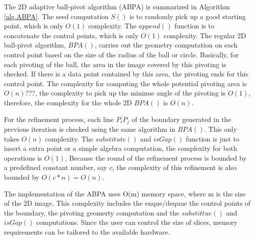 The 2D adaptive ball-pivot algorithm (ABPA) is summarized in Algorithm \ref{alg.ABPA}. 
The seed computation $S()$ is to randomly pick up a good starting point, which
is only $O(1)$ complexity. The $append()$ function is to concatenate the control 
points, which is only $O(1)$ complexity. The regular 2D ball-pivot algorithm, $BPA()$,
carries out the geometry computation on each control point based on the size of the
radius of the ball or circle. Basically, for each pivoting of the ball, the area 
in the image covered by this pivoting is checked. If there is a data point contained
by this area, the pivoting ends for this control point. 
The complexity for computing the whole potential pivoting area is $O(n)$???, the
complexity to pick up the mininue angle of the pivoting is $O(1)$, therefore, the 
complexity for the whole 2D $BPA()$ is $O(n)$. 

For the refinement process, each line $\overline{P_iP_j}$ of the boundary generated
in the previous iteration is checked using the same algorithm in $BPA()$. This only
takes $O(n)$ complexity. The $substitute()$ and $isGap()$ function is just to insert
a extra point or a simple algebra computation, the complexity for both operations is 
$O(1)$, Because the round of the refinement process is bounded by a predefined constant 
number, say $c$, the complexity of this refinement is also bounded by $O(c*n) = O(n)$. 

The implementation of the ABPA uses O(m) memory space, where m is the size of the 2D image.
This complexity includes the enque/dequue the control points of the boundary, the 
pivoting geomerty computation and the $substittue()$ and $isGap()$ computations. Since
the user can control the size of slices, memory requirements can be tailored to the
available hardware. 

